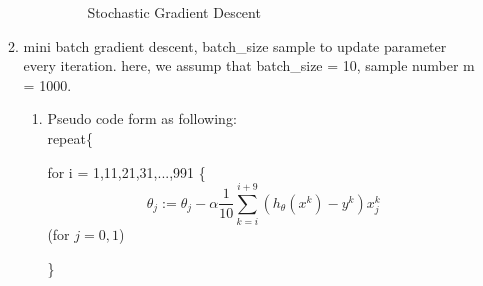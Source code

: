\documentclass[12pt]{ctexart}%
\begin{document}
\begin{itemize}
\begin{enumerate}[(1)]
\begin{enumerate}
\begin{figure}[H]
							\renewcommand{\figurename}{Fig} %
							\caption{Stochastic Gradient Descent}
							\label{fig:4}
						\end{figure}
					\end{enumerate}
			
				\item mini batch gradient descent, batch\_size sample to update parameter every iteration. here, we assump that batch\_size = 10, sample number m = 1000.
					\begin{enumerate}
						\item Pseudo code form as following:\\
							repeat\{
						
							\qquad for i = 1,11,21,31,...,991 \{
							$$\theta_j := \theta_j - \alpha\frac{1}{10}\sum_{k=i}^{i+9}(h_\theta(x^k) - y^k)x_j^k$$
							\qquad \qquad \qquad(for $j = 0,1$)
							
							\qquad \}
							

\end{enumerate}
\end{enumerate}
\end{itemize}
\end{document}
